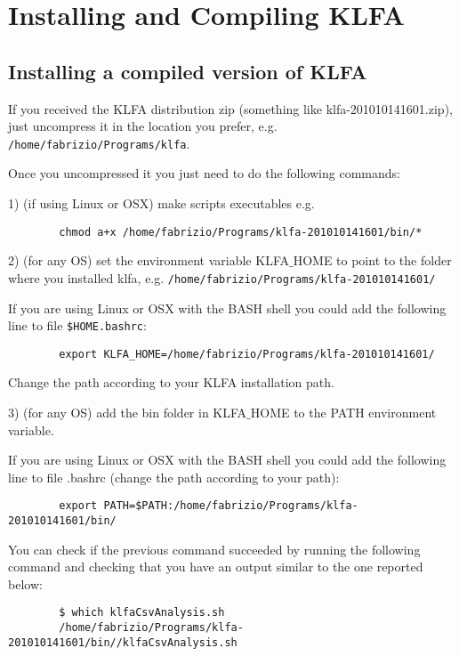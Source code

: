 \chapter{Installing and Compiling KLFA}

\section{Installing a compiled version of KLFA}
\label{sec:installKLFA}

If you received the KLFA distribution zip (something like
klfa-201010141601.zip), just uncompress it in the location you prefer, 
e.g. \texttt{/home/fabrizio/Pro\-grams/klfa}.
  
Once you uncompressed it you just need to do the following commands:

	1) (if using Linux or OSX) make scripts executables
		e.g. 
		\begin{verbatim}
		chmod a+x /home/fabrizio/Programs/klfa-201010141601/bin/*
		\end{verbatim}

	2) (for any OS) set the environment variable KLFA$\_$HOME to point to the 
		folder where you installed klfa, e.g. 
		\texttt{/home/fabrizio/Programs/klfa-201010141601/}
		
		If you are using Linux or OSX with the BASH shell you could add the 
		following line to file \texttt{\$HOME.bashrc}:
		
		\begin{verbatim}
		export KLFA_HOME=/home/fabrizio/Programs/klfa-201010141601/
		\end{verbatim}

	Change the path according to your KLFA installation path.
	
	3) (for any OS) add the bin folder in KLFA$\_$HOME to the PATH environment 
		variable.
		
		If you are using Linux or OSX with the BASH shell you could add the 
		following line to file .bashrc (change the path according to your path):
		
		\begin{verbatim}
		export PATH=$PATH:/home/fabrizio/Programs/klfa-201010141601/bin/
		\end{verbatim}
		
		
		You can check if the previous command succeeded by running the following
		command and checking that you have an output similar to the one 
		reported below:
		
		\begin{verbatim}
		$ which klfaCsvAnalysis.sh
		/home/fabrizio/Programs/klfa-201010141601/bin//klfaCsvAnalysis.sh
		\end{verbatim}


